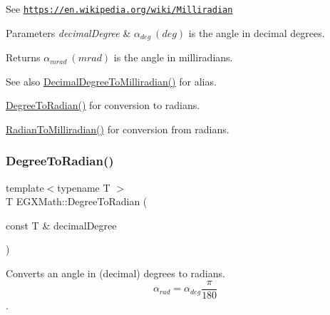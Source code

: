 See \href{https://en.wikipedia.org/wiki/Milliradian}{\tt https\+://en.\+wikipedia.\+org/wiki/\+Milliradian} 
\begin{DoxyParams}{Parameters}
{\em decimal\+Degree} & $\alpha_{deg}\ (deg)$ is the angle in decimal degrees. \\
\hline
\end{DoxyParams}
\begin{DoxyReturn}{Returns}
$\alpha_{mrad}\ (mrad)$ is the angle in milliradians. 
\end{DoxyReturn}
\begin{DoxySeeAlso}{See also}
\mbox{\hyperlink{group___e_g_x_math-_angle_conversions-_decimal_degree_gab567d02d4692d9642a4ad219e479713a}{Decimal\+Degree\+To\+Milliradian()}} for alias. 

\mbox{\hyperlink{group___e_g_x_math-_angle_conversions-_degree_ga48585541b228c852c9d08a9eac3682f0}{Degree\+To\+Radian()}} for conversion to radians. 

\mbox{\hyperlink{group___e_g_x_math-_angle_conversions-_radian_gaea391f0cca39b05e298dd1cae162e7f1}{Radian\+To\+Milliradian()}} for conversion from radians. 
\end{DoxySeeAlso}
\mbox{\label{group___e_g_x_math-_angle_conversions-_degree_ga48585541b228c852c9d08a9eac3682f0}} 
\subsubsection{\texorpdfstring{Degree\+To\+Radian()}{DegreeToRadian()}}
{\footnotesize\ttfamily template$<$typename T $>$ \\
T E\+G\+X\+Math\+::\+Degree\+To\+Radian (\begin{DoxyParamCaption}\item[{const T \&}]{decimal\+Degree }\end{DoxyParamCaption})}



Converts an angle in (decimal) degrees to radians. \[\alpha_{rad}=\alpha_{deg}\frac{\pi}{180}\]. 


